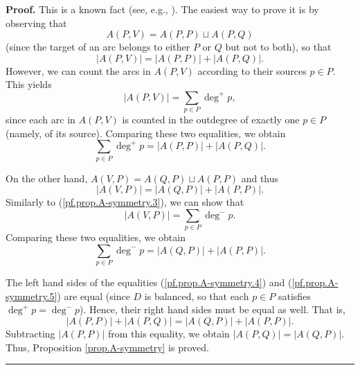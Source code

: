 \documentclass[numbers=enddot,12pt,final,onecolumn,notitlepage]{scrartcl}%
\theoremstyle{definition}
\newenvironment{proof}[1][Proof]{\noindent\textbf{#1.} }{\ \rule{0.5em}{0.5em}}
\let\sumnonlimits\sum
\renewcommand{\sum}{\sumnonlimits\limits}
\theoremstyle{plainsl}
\begin{document}
\begin{proof}
This is a known fact (see, e.g., \cite[Exercise 9.1]{22s}). The easiest way to
prove it is by observing that%
\[
A\left(  P,V\right)  =A\left(  P,P\right)  \sqcup A\left(  P,Q\right)
\]
(since the target of an arc belongs to either $P$ or $Q$ but not to both), so
that%
\[
\left\vert A\left(  P,V\right)  \right\vert =\left\vert A\left(  P,P\right)
\right\vert +\left\vert A\left(  P,Q\right)  \right\vert .
\]
However, we can count the arcs in $A\left(  P,V\right)  $ according to their
sources $p\in P$. This yields%
\begin{equation}
\left\vert A\left(  P,V\right)  \right\vert =\sum_{p\in P}\deg^{+}p,
\label{pf.prop.A-symmetry.3}%
\end{equation}
since each arc in $A\left(  P,V\right)  $ is counted in the outdegree of
exactly one $p\in P$ (namely, of its source). Comparing these two equalities,
we obtain%
\begin{equation}
\sum_{p\in P}\deg^{+}p=\left\vert A\left(  P,P\right)  \right\vert +\left\vert
A\left(  P,Q\right)  \right\vert . \label{pf.prop.A-symmetry.4}%
\end{equation}


\noindent On the other hand, $A\left(  V,P\right)  =A\left(  Q,P\right)
\sqcup A\left(  P,P\right)  $ and thus%
\[
\left\vert A\left(  V,P\right)  \right\vert =\left\vert A\left(  Q,P\right)
\right\vert +\left\vert A\left(  P,P\right)  \right\vert .
\]
Similarly to (\ref{pf.prop.A-symmetry.3}), we can show that%
\[
\left\vert A\left(  V,P\right)  \right\vert =\sum_{p\in P}\deg^{-}p.
\]
Comparing these two equalities, we obtain%
\begin{equation}
\sum_{p\in P}\deg^{-}p=\left\vert A\left(  Q,P\right)  \right\vert +\left\vert
A\left(  P,P\right)  \right\vert . \label{pf.prop.A-symmetry.5}%
\end{equation}


The left hand sides of the equalities (\ref{pf.prop.A-symmetry.4}) and
(\ref{pf.prop.A-symmetry.5}) are equal (since $D$ is balanced, so that each
$p\in P$ satisfies $\deg^{+}p=\deg^{-}p$). Hence, their right hand sides must
be equal as well. That is,%
\[
\left\vert A\left(  P,P\right)  \right\vert +\left\vert A\left(  P,Q\right)
\right\vert =\left\vert A\left(  Q,P\right)  \right\vert +\left\vert A\left(
P,P\right)  \right\vert .
\]
Subtracting $\left\vert A\left(  P,P\right)  \right\vert $ from this equality,
we obtain $\left\vert A\left(  P,Q\right)  \right\vert =\left\vert A\left(
Q,P\right)  \right\vert $. Thus, Proposition \ref{prop.A-symmetry} is proved.
\end{proof}
\end{document}
